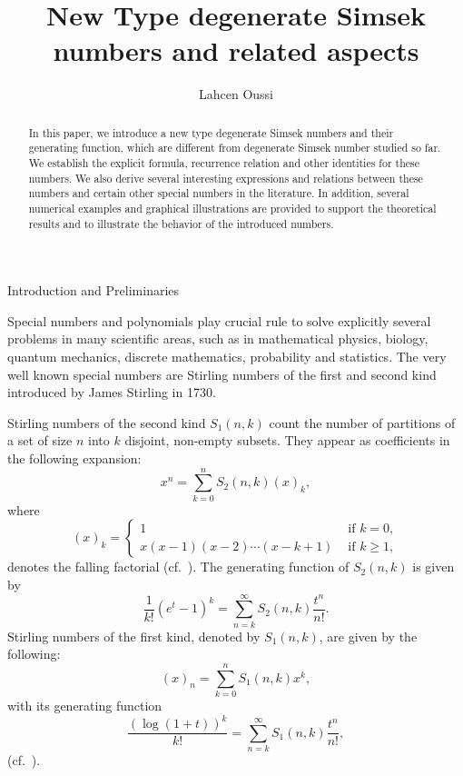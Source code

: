 \documentclass{amsart}
\title[New Type degenerate Simsek numbers and related aspects]{New Type degenerate Simsek numbers and related aspects}
\author{Lahcen Oussi}
\numberwithin{equation}{section}
\theoremstyle{definition}
\theoremstyle{remark}
\begin{document}
\begin{abstract}
In this paper, we introduce a new type degenerate Simsek numbers and their generating function, which are different from degenerate Simsek number studied so far. We establish the explicit formula, recurrence relation and other identities for these numbers. We also derive several interesting expressions and relations between these numbers and certain other special numbers in the literature. In addition, several numerical examples and graphical illustrations are provided to support the theoretical results and to illustrate the behavior of the introduced numbers.
\end{abstract}



\maketitle

\begin{section}
{Introduction and Preliminaries}
\end{section}

Special numbers and polynomials play  crucial rule to solve explicitly several problems in many scientific areas, such as in mathematical physics, biology, quantum mechanics, discrete mathematics, probability and statistics. The very well known special numbers are Stirling numbers of the first and second kind introduced by James Stirling in 1730.   

Stirling numbers of the second kind $S_{1}(n,k)$ count the number of partitions of a set of
size $n$ into $k$ disjoint, non-empty subsets. They appear as coefficients in the following expansion:
\begin{equation}\label{SNSK}
    x^n=\sum_{k=0}^{n}S_{2}(n,k)(x)_{k},
\end{equation}
where $$(x)_k=\begin{cases}
   1 & \text{ if } k=0,  \\[5pt]
    x(x-1)(x-2)\cdots (x-k+1) & \text{ if } k\geq 1,
  \end{cases}$$
denotes the falling factorial (cf.\ \cite{LC1974,SR1983}). The generating function of $S_{2}(n,k)$ is given by
\begin{equation}\label{GFSNSK}
 \frac{1}{k!}(e^t-1)^k=\sum_{n=k}^{\infty}S_{2}(n,k)\frac{t^n}{n!}.  
\end{equation}
Stirling numbers of the first kind, denoted by $S_{1}(n,k)$, are given by the following:
\begin{equation}\label{SNFK}
    (x)_n=\sum_{k=0}^{n}S_{1}(n,k)x^k,
\end{equation}
with its generating function
\begin{equation}\label{GFSNFK}
   \frac{(\log(1+t))^k}{k!}=\sum_{n=k}^{\infty}S_{1}(n,k)\frac{t^n}{n!}, 
\end{equation}
(cf.\ \cite{LC1974,SR1983}).
\end{document}
